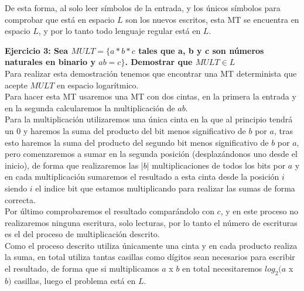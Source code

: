 \documentclass[11pt]{article}
\begin{document}
De esta forma, al solo leer símbolos de la entrada, y los únicos símbolos para comprobar que está en espacio $L$ son los nuevos escritos, esta MT se encuentra en espacio $L$, y por lo tanto todo lenguaje regular está en $L$.


\newpage


\Large{\textbf{Ejercicio 3: Sea $MULT = \{a * b * c$ tales que a, b y c son números naturales en binario y $a  b = c\}$. Demostrar que $MULT \in L$}}
\\

\normalsize
Para realizar esta demostración tenemos que encontrar una MT determinista que acepte $MULT$ en espacio logarítmico.\\

Para hacer esta MT usaremos una MT con dos cintas, en la primera la entrada y en la segunda calcularemos la multiplicación de $a  b$.\\

Para la multiplicación utilizaremos una única cinta en la que al principio tendrá un 0 y haremos la suma del producto del bit menos significativo de $b$ por $a$, tras esto haremos la suma del producto del segundo bit menos significativo de $b$ por $a$, pero comenzaremos a sumar en la segunda posición (desplazándonos uno desde el inicio), de forma que realizaremos las $|b|$ multiplicaciones de todos los bits por $a$ y en cada multiplicación sumaremos el resultado a esta cinta desde la posición $i$ siendo $i$ el indice bit que estamos multiplicando para realizar las sumas de forma correcta.\\

Por último comprobaremos el resultado comparándolo con $c$, y en este proceso no realizaremos ninguna escritura, solo lecturas, por lo tanto el número de escrituras es el del proceso de multiplicación descrito.\\

Como el proceso descrito utiliza únicamente una cinta y en cada producto realiza la suma, en total utiliza tantas casillas como dígitos sean necesarios para escribir el resultado, de forma que si multiplicamos $a$ x $b$ en total necesitaremos $log_2(a$ x $b)$ casillas, luego el problema está en $L$.
\end{document}
